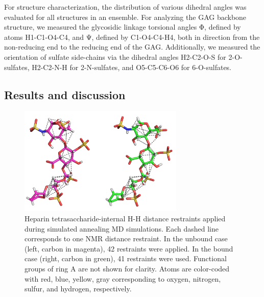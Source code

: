 For structure characterization, the distribution of various dihedral angles was
evaluated for all structures in an ensemble. For analyzing the GAG backbone
structure, we measured the glycosidic linkage torsional angles Φ, defined by
atoms H1-C1-O4-C4, and Ψ, defined by C1-O4-C4-H4, both in direction from the
non-reducing end to the reducing end of the GAG. Additionally, we measured the
orientation of sulfate side-chains via the dihedral angles H2-C2-O-S for
2-O-sulfates, H2-C2-N-H for 2-N-sulfates, and O5-C5-C6-O6 for 6-O-sulfates.

\subsection{Results and discussion}

\begin{figure}
\centering
\includegraphics[width=0.7\textwidth]{gfx/nmr/two_cases_dashed_lines_distances.png}
\caption[]{
Heparin tetrasaccharide-internal H-H distance restraints applied during
simulated annealing MD simulations. Each dashed line corresponds to one NMR
distance restraint. In the unbound case (left, carbon in magenta), 42
restraints were applied. In the bound case (right, carbon in green), 41
restraints were used. Functional groups of ring A are not shown for clarity.
Atoms are color-coded with red, blue, yellow, gray corresponding to oxygen,
nitrogen, sulfur, and hydrogen, respectively.
}
\label{fig:nmr:hp_dashed_lines_distances}
\end{figure}

